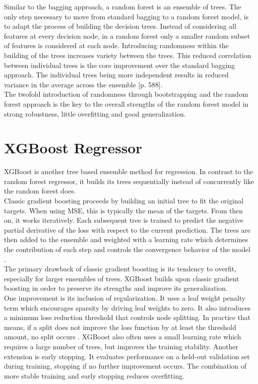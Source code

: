 Similar to the bagging approach, a random forest is an ensemble of trees. The only step necessary to move from standard bagging to a random forest model, is to adapt the process of building the decision trees. Instead of considering all features at every decision node, in a random forest only a smaller random subset of features is considered at each node. Introducing randomness within the building of the trees increases variety between the trees. This reduced correlation between individual trees is the core improvement over the standard bagging approach. The individual trees being more independent results in reduced variance in the average across the ensemble \citep{hastie_elements_2009}[p. 588]. \\
The twofold introduction of randomness through bootstrapping and the random forest approach is the key to the overall strengths of the random forest model in strong robustness, little overfitting and good generalization.




\section{XGBoost Regressor}

XGBoost is another tree based ensemble method for regression. In contrast to the random forest regressor, it builds its trees sequentially instead of concurrently like the random forest does. \\
Classic gradient boosting proceeds by building an initial tree to fit the original targets. When using MSE, this is typically the mean of the targets. From then on, it works iteratively. Each subsequent tree is trained to predict the negative partial derivative of the loss with respect to the current prediction. The trees are then added to the ensemble and weighted with a learning rate which determines the contribution of each step and controls the convergence behavior of the model \cite{chen_xgboost_2016}. \\
The primary drawback of classic gradient boosting is its tendency to overfit, especially for larger ensembles of trees. XGBoost builds upon classic gradient boosting in order to preserve its strengths and improve its generalization. \\
One improvement is its inclusion of regularization. It uses a leaf weight penalty term which encourages sparsity by driving leaf weights to zero. It also introduces a minimum loss reduction threshold that controls node splitting. In practice that means, if a split does not improve the loss function by at least the threshold amount, no split occurs \cite{chen_xgboost_2016}. XGBoost also often uses a small learning rate which requires a large number of trees, but improves the training stability. Another extension is early stopping. It evaluates performance on a held-out validation set during training, stopping if no further improvement occurs. The combination of more stable training and early stopping reduces overfitting.





